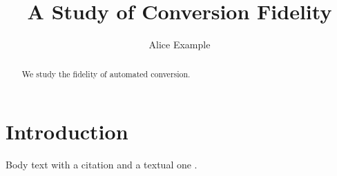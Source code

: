 \documentclass{elsarticle}
\title{A Study of Conversion Fidelity}
\author{Alice Example}
\begin{document}
\maketitle
\begin{abstract}
We study the fidelity of automated conversion.
\end{abstract}
\section{Introduction}
Body text with a citation \citep{knuth1984} and a textual one \citet{lamport1994}.


\end{document}
